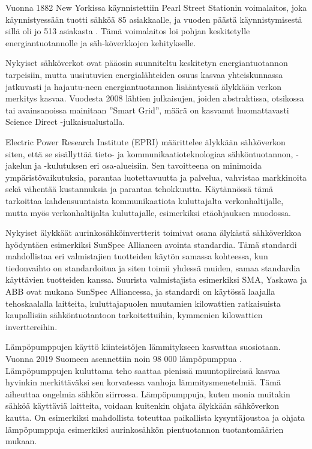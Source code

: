 Vuonna 1882 New Yorkissa käynnistettiin Pearl Street Stationin voimalaitos, joka käynnistyessään tuotti sähköä 85 asiakkaalle, ja vuoden päästä käynnistymisestä sillä oli jo 513 asiakasta \parencite{pearlStreetStation}. Tämä voimalaitos loi pohjan keskitetylle energiantuotannolle ja säh-köverkkojen kehitykselle.

Nykyiset sähköverkot ovat pääosin suunniteltu keskitetyn energiantuotannon tarpeisiin, mutta uusiutuvien energialähteiden osuus kasvaa yhteiskunnassa jatkuvasti ja hajautu-neen energiantuotannon lisääntyessä älykkään verkon merkitys kasvaa. Vuodesta 2008 lähtien julkaisujen, joiden abstraktissa, otsikossa tai avainsanoissa mainitaan ”Smart Grid”, määrä on kasvanut huomattavasti Science Direct -julkaisualustalla. \parencite{Tuballa&Abundo}

Electric Power Research Institute (EPRI) määrittelee älykkään sähköverkon siten, että se sisällyttää tieto- ja kommunikaatioteknologiaa sähköntuotannon, -jakelun ja -kulutuksen eri osa-alueisiin. Sen tavoitteena on minimoida ympäristövaikutuksia, parantaa luotettavuutta ja palvelua, vahvistaa markkinoita sekä vähentää kustannuksia ja parantaa tehokkuutta. Käytännössä tämä tarkoittaa kahdensuuntaista kommunikaatiota kuluttajalta verkonhaltijalle, mutta myös verkonhaltijalta kuluttajalle, esimerkiksi etäohjauksen muodossa. \parencite{SGdefinition}

Nykyiset älykkäät aurinkosähköinvertterit toimivat osana älykästä sähköverkkoa hyödyntäen esimerkiksi SunSpec Alliancen avointa standardia. Tämä standardi mahdollistaa eri valmistajien tuotteiden käytön samassa kohteessa, kun tiedonvaihto on standardoitua ja siten toimii yhdessä muiden, samaa standardia käyttävien tuotteiden kanssa. Suurista valmistajista esimerkiksi SMA, Yaskawa ja ABB ovat mukana SunSpec Alliancessa, ja standardi on käytössä laajalla tehoskaalalla laitteita, kuluttajapuolen muutamien kilowattien ratkaisuista kaupallisiin sähköntuotantoon tarkoitettuihin, kymmenien kilowattien inverttereihin. \parencite{SSProds}

Lämpöpumppujen käyttö kiinteistöjen lämmitykseen kasvattaa suosiotaan. Vuonna 2019 Suomeen asennettiin noin 98 000 lämpöpumppua \parencite{sulpu}. Lämpöpumppujen kuluttama teho saattaa pienissä muuntopiireissä kasvaa hyvinkin merkittäväksi sen korvatessa vanhoja lämmitysmenetelmiä. Tämä aiheuttaa ongelmia sähkön siirrossa. Lämpöpumppuja, kuten monia muitakin sähköä käyttäviä laitteita, voidaan kuitenkin ohjata älykkään sähköverkon kautta. On esimerkiksi mahdollista toteuttaa paikallista kysyntäjoustoa ja ohjata lämpöpumppuja esimerkiksi aurinkosähkön pientuotannon tuotantomäärien mukaan.

